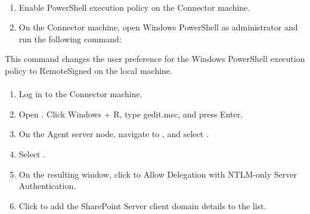 \documentclass[letterpaper,10pt,english]{sphinxmanual}
\begin{document}
\paragraph{}
\label{\detokenize{mcdmp_app_ug:id4}}\begin{enumerate}
\item {} 
Enable PowerShell execution policy on the Connector machine.

\item {} 
On the Connector machine, open Windows PowerShell as administrator and run the following command:

\end{enumerate}
\begin{quote}

\end{quote}

This command changes the user preference for the Windows PowerShell execution policy to RemoteSigned on the local machine.


\paragraph{}
\label{\detokenize{mcdmp_app_ug:id5}}
\begin{enumerate}
\item {} 
Log in to the Connector machine.

\item {} 
Open . Click Windows + R, type gedit.msc, and press Enter.

\item {} 
On the Agent server node, navigate to , and select .

\item {} 
Select .

\item {} 
On the resulting window, click  to Allow Delegation with NTLM-only Server Authentication.

\item {} 
Click  to add the SharePoint Server client domain details to the  list.

\end{enumerate}
\end{document}

